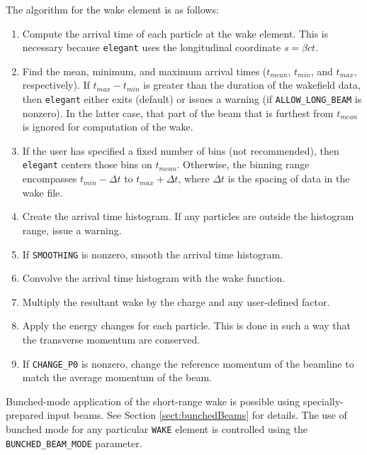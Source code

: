 The algorithm for the wake element is as follows:
\begin{enumerate}
\item Compute the arrival time of each particle at the wake element. This
 is necessary because {\tt elegant} uses the longitudinal coordinate $s=\beta c t$.
\item Find the mean, minimum, and maximum arrival times ($t_{mean}$, $t_{min}$, and
 $t_{max}$, respectively).  If $t_{max}-t_{min}$ is greater than the duration of 
 the wakefield data, then {\tt elegant} either exits (default) or issues a warning (if 
 \verb|ALLOW_LONG_BEAM| is nonzero).  In the latter case, that part of the beam that
 is furthest from $t_{mean}$ is ignored for computation of the wake.
\item If the user has specified a fixed number of bins (not recommended), then {\tt elegant}
 centers those bins on $t_{mean}$.  Otherwise, the binning range encompasses $t_{min}-\Delta t$
 to $t_{max}+\Delta t$, where $\Delta t$ is the spacing of data in the wake file.
\item Create the arrival time histogram.  If any particles are outside the histogram range,
 issue a warning.
\item If \verb|SMOOTHING| is nonzero, smooth the arrival time histogram.
\item Convolve the arrival time histogram with the wake function.
\item Multiply the resultant wake by the charge and any user-defined factor.
\item Apply the energy changes for each particle.  This is done in such a way that
 the transverse momentum are conserved.
\item If \verb|CHANGE_P0| is nonzero, change the reference momentum of the beamline to 
 match the average momentum of the beam.
\end{enumerate}

Bunched-mode application of the short-range wake is possible using specially-prepared input
beams. 
See Section \ref{sect:bunchedBeams} for details.
The use of bunched mode for any particular \verb|WAKE| element is controlled using the \verb|BUNCHED_BEAM_MODE| parameter.
